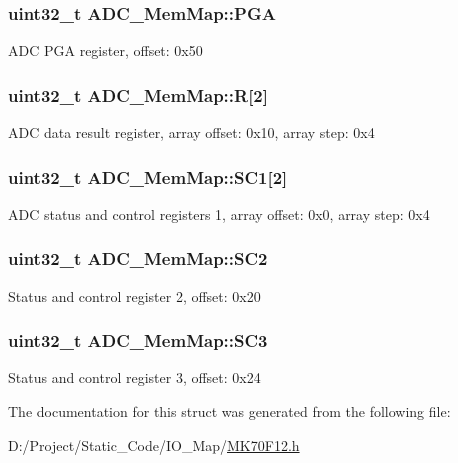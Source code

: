 \subsubsection[{P\+G\+A}]{\setlength{\rightskip}{0pt plus 5cm}uint32\+\_\+t A\+D\+C\+\_\+\+Mem\+Map\+::\+P\+G\+A}\label{struct_a_d_c___mem_map_a3c43d657acb03daee1a6abbb58206a56}
A\+D\+C P\+G\+A register, offset\+: 0x50 \hypertarget{struct_a_d_c___mem_map_acbd8ded0e3f30d8502e9b9229e092fe8}{}
\subsubsection[{R}]{\setlength{\rightskip}{0pt plus 5cm}uint32\+\_\+t A\+D\+C\+\_\+\+Mem\+Map\+::\+R\mbox{[}2\mbox{]}}\label{struct_a_d_c___mem_map_acbd8ded0e3f30d8502e9b9229e092fe8}
A\+D\+C data result register, array offset\+: 0x10, array step\+: 0x4 \hypertarget{struct_a_d_c___mem_map_ab3900b4bfe889cd9d04850d121394741}{}
\subsubsection[{S\+C1}]{\setlength{\rightskip}{0pt plus 5cm}uint32\+\_\+t A\+D\+C\+\_\+\+Mem\+Map\+::\+S\+C1\mbox{[}2\mbox{]}}\label{struct_a_d_c___mem_map_ab3900b4bfe889cd9d04850d121394741}
A\+D\+C status and control registers 1, array offset\+: 0x0, array step\+: 0x4 \hypertarget{struct_a_d_c___mem_map_ad7caff2bf5e2dfb2159d174af24dc693}{}
\subsubsection[{S\+C2}]{\setlength{\rightskip}{0pt plus 5cm}uint32\+\_\+t A\+D\+C\+\_\+\+Mem\+Map\+::\+S\+C2}\label{struct_a_d_c___mem_map_ad7caff2bf5e2dfb2159d174af24dc693}
Status and control register 2, offset\+: 0x20 \hypertarget{struct_a_d_c___mem_map_a68295218c104f78bc2b11f04c06ce55e}{}
\subsubsection[{S\+C3}]{\setlength{\rightskip}{0pt plus 5cm}uint32\+\_\+t A\+D\+C\+\_\+\+Mem\+Map\+::\+S\+C3}\label{struct_a_d_c___mem_map_a68295218c104f78bc2b11f04c06ce55e}
Status and control register 3, offset\+: 0x24 

The documentation for this struct was generated from the following file\+:\begin{DoxyCompactItemize}
\item 
D\+:/\+Project/\+Static\+\_\+\+Code/\+I\+O\+\_\+\+Map/\hyperlink{_m_k70_f12_8h}{M\+K70\+F12.\+h}\end{DoxyCompactItemize}

